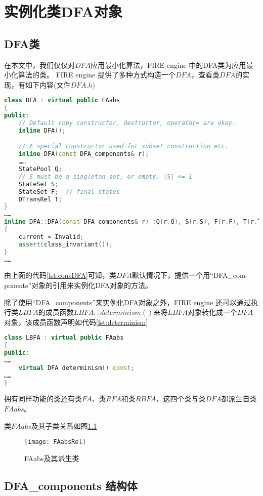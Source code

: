 \chapter{实例化类DFA对象}

\section{DFA类}
在本文中，我们仅仅对$DFA$应用最小化算法，FIRE engine 中的DFA类为应用最小化算法的类。
FIRE engine 提供了多种方式构造一个$DFA$，查看类$DFA$的实现，有如下内容(文件$DFA.h$)
\lstset{style=mystyle}
\begin{lstlisting}[language=C++,label={lst:consDFA},caption={class DFA}]
class DFA : virtual public FAabs
{
public:
    // Default copy constructor, destructor, operator= are okay.
    inline DFA();

    // A special constructor used for subset construction etc.
    inline DFA(const DFA_components& r);
    ……
    StatePool Q;
    // S must be a singleton set, or empty. |S| <= 1
    StateSet S;
    StateSet F;  // final states
    DTransRel T;
}
……
inline DFA::DFA(const DFA_components& r) :Q(r.Q), S(r.S), F(r.F), T(r.T)
{
    current = Invalid;
    assert(class_invariant());
}
……
\end{lstlisting}
由上面的代码\ref{lst:consDFA}可知，类$DFA$默认情况下，提供一个用“DFA\_com-ponents”对象的引用来实例化DFA对象的方法。

除了使用“DFA\_components”来实例化DFA对象之外，FIRE engine 还可以通过执行类$LBFA$的成员函数$LBFA::determinism()$来将$LBFA$对象转化成一个$DFA$对象，该成员函数声明如代码\ref{lst:determinism}
\lstset{style=mystyle}
\begin{lstlisting}[language=C++,label={lst:determinism},caption={LBFA::determinism()}]
class LBFA : virtual public FAabs
{
public:
……
    virtual DFA determinism() const;
……
}
\end{lstlisting}
拥有同样功能的类还有类$FA$、类$RFA$和类$RBFA$，这四个类与类$DFA$都派生自类$FAabs$。

类$FAabs$及其子类关系如图\ref{fig:FAabsRel}

\begin{figure}[!htbp]
    \centering
    \texttt{[image: FAabsRel]}
    \caption{FAabs及其派生类}
    \label{fig:FAabsRel}
\end{figure}

\section{DFA\_components 结构体}\label{sc:dfa_com}%

